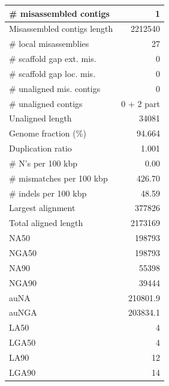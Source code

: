 \documentclass[12pt,a4paper]{article}
\begin{document}
\begin{table}[ht]
\begin{center}
\begin{tabular}{|l*{1}{|r}|}
\# misassembled contigs & 1 \\ \hline
Misassembled contigs length & 2212540 \\ \hline
\# local misassemblies & 27 \\ \hline
\# scaffold gap ext. mis. & 0 \\ \hline
\# scaffold gap loc. mis. & 0 \\ \hline
\# unaligned mis. contigs & 0 \\ \hline
\# unaligned contigs & 0 + 2 part \\ \hline
Unaligned length & 34081 \\ \hline
Genome fraction (\%) & 94.664 \\ \hline
Duplication ratio & 1.001 \\ \hline
\# N's per 100 kbp & 0.00 \\ \hline
\# mismatches per 100 kbp & 426.70 \\ \hline
\# indels per 100 kbp & 48.59 \\ \hline
Largest alignment & 377826 \\ \hline
Total aligned length & 2173169 \\ \hline
NA50 & 198793 \\ \hline
NGA50 & 198793 \\ \hline
NA90 & 55398 \\ \hline
NGA90 & 39444 \\ \hline
auNA & 210801.9 \\ \hline
auNGA & 203834.1 \\ \hline
LA50 & 4 \\ \hline
LGA50 & 4 \\ \hline
LA90 & 12 \\ \hline
LGA90 & 14 \\ \hline
\end{tabular}
\end{center}
\end{table}
\end{document}
